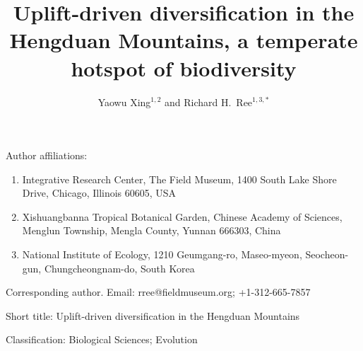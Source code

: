 \documentclass[12pt]{article}
\begin{document}
\raggedright
\parindent 0.5in

\title{Uplift-driven diversification in the Hengduan Mountains, a
  temperate hotspot of biodiversity}

\date{Yaowu Xing$^{1,2}$ and Richard H.\ Ree$^{1,3,*}$}
\maketitle

\noindent Author affiliations:
\begin{enumerate}

\item Integrative Research Center, The Field Museum, 1400 South Lake Shore Drive, Chicago, Illinois 60605, USA

\item Xishuangbanna Tropical Botanical Garden, Chinese Academy of Sciences, Menglun Township, Mengla County, Yunnan 666303, China %

\item National Institute of Ecology, 1210 Geumgang-ro, Maseo-myeon, Seocheon-gun, Chungcheongnam-do, South Korea

\end{enumerate}

\noindent * Corresponding author. Email: rree@fieldmuseum.org; +1-312-665-7857

\bigskip

\noindent Short title: Uplift-driven diversification in the Hengduan Mountains

\noindent Classification: Biological Sciences; Evolution


\newpage



\newpage







%



\end{document}
